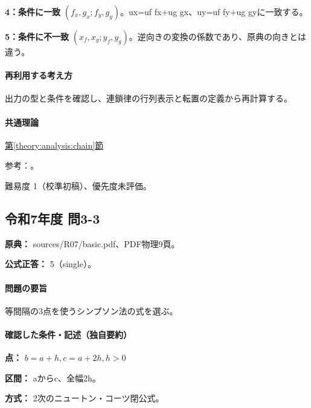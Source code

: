 \noindent\textbf{4：条件に一致} \((f_x,g_x;f_y,g_y)\)。ux=\allowbreak{}uf fx+ug gx、uy=\allowbreak{}uf fy+ug gyに一致する。\par

\noindent\textbf{5：条件に不一致} \((x_f,x_g;y_f,y_g)\)。逆向きの変換の係数であり、原典の向きとは違う。\par

\paragraph{再利用する考え方} 出力の型と条件を確認し、連鎖律の行列表示と転置の定義から再計算する。

\paragraph{共通理論} \hyperref[theory:analysis:chain]{第\ref*{theory:analysis:chain}節}

\par 参考：\cite{mit_chain2007}。

\par 難易度 1（校準初稿）、優先度未評価。

\subsection{令和7年度 問3-3}
\label{q:r07-reg-basic-3-3}

\noindent\textbf{原典：} sources/R07/basic.pdf、PDF物理9頁。

\textbf{公式正答：} 5（single）。

\paragraph{問題の要旨} 等間隔の3点を使うシンプソン法の式を選ぶ。

\paragraph{確認した条件・記述（独自要約）}\mbox{}\par

\noindent\textbf{点：} \(b=a+h,c=a+2h,h>0\)\par

\noindent\textbf{区間：} aからc、全幅2h。\par

\noindent\textbf{方式：} 2次のニュートン・コーツ閉公式。\par

